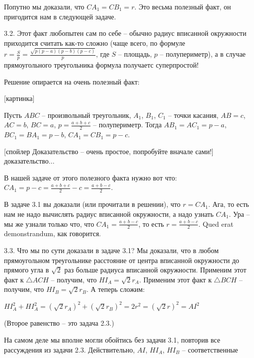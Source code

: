 Попутно мы доказали, что $CA_1 = CB_1 = r$. Это весьма полезный факт, он пригодится нам в следующей задаче.

3.2. Этот факт любопытен сам по себе -- обычно радиус вписанной окружности приходится считать как-то сложно (чаще всего, по формуле $r = \frac{S}{p} = \frac{\sqrt{p(p-a)(p-b)(p-c)}}{p}$, где $S$ -- площадь, $p$ -- полупериметр), а в случае прямоугольного треугольника формула получаетс суперпростой!

Решение опирается на очень полезный факт:

[картинка]

Пусть $ABC$ -- произвольный треугольник, $A_1$, $B_1$, $C_1$ -- точки касания, $AB = c$, $AC = b$, $BC = a$, $p = \frac{a+b+c}{2}$ -- полупериметр. Тогда $AB_1 = AC_1 = p - a$, $BC_1 = BA_1 = p - b$, $CA_1 = CB_1 = p - c$.

[спойлер Доказательство -- очень простое, попробуйте вначале сами!] доказательство...

В нашей задаче от этого полезного факта нужно вот что: $CA_1 = p - c = \frac{a+b+c}{2} - c = \frac{a + b - c}{2}$. 

В задаче 3.1 вы доказали (или прочитали в решении), что $r = CA_1$. Ага, то есть нам не надо вычислять радиус вписанной окружности, а надо узнать $CA_1$. Ура -- мы же узнали только что, что $CA_1 = \frac{a + b - c}{2}$, то есть $r = \frac{a + b - c}{2}$. Qued erat demonstrandum, как говорится.

3.3. Что мы по сути доказали в задаче 3.1? Мы доказали, что в любом прямоугольном треугольнике расстояние от центра вписанной окружности до прямого угла в $\sqrt{2}$ раз больше радиуса вписанной окружности. Применим этот факт к $\triangle ACH$ -- получим, что $HI_A = \sqrt{2} r_A$. Применим этот факт к $\triangle BCH$ -- получим, что $HI_B = \sqrt{2} r_B$. А теперь сложим: 

$HI_A^2 + HI_A^2 = (\sqrt{2} r_A)^2 + (\sqrt{2} r_B)^2 = 2r^2 = (\sqrt{2} r)^2 = AI^2$

(Второе равенство -- это задача 2.3.)

На самом деле мы вполне могли обойтись без задачи 3.1, повторив все рассуждения из задачи 2.3. Действительно, $AI$, $HI_A$, $HI_B$ -- соответственные 
